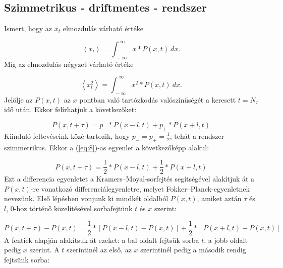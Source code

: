 \section{}
\subsection{Szimmetrikus - driftmentes - rendszer}
Ismert, hogy az $x_{t}$ elmozdulás várható értéke

\begin{equation} \label{eq:6}
    \left< x_{t} \right>
    =
    \int_{\ -\infty}^{\ \infty} x * P \left( x, t \right)\ dx.
\end{equation}
Míg az elmozdulás négyzet várható értéke

\begin{equation} \label{eq:7}
    \left< x_{t}^{2} \right>
    =
    \int_{\ -\infty}^{\ \infty} x^{2} * P \left( x, t \right)\ dx.
\end{equation}
Jelölje az $P \left( x, t \right)$ az $x$ pontban való tartózkodás valószínűségét a keresett $t = N_\tau$ idő után. Ekkor felírhatjuk a következőket\cite{randwalk}:

\begin{equation} \label{eq:8}
    P \left( x, t + \tau \right)
    =
    p_{-} * P \left( x - l, t \right) + p_{+} * P \left( x + l, t \right)
\end{equation}
Kiinduló feltevéseink közé tartozik, hogy $p_{-} = p_{+} = \frac{1}{2}$, tehát a rendszer szimmetrikus. Ekkor a (\ref{eq:8})-as egyenlet a következőképp alakul:

\begin{equation} \label{eq:9}
    P \left( x, t + \tau \right)
    =
    \frac{1}{2} * P \left( x - l, t \right) + \frac{1}{2} * P \left( x + l, t \right)
\end{equation}
Ezt a differencia egyenletet a Kramers--Moyal-sorfejtés segítségével alakítjuk át a $P \left( x, t \right)$-re vonatkozó differenciálegyenletre, melyet Fokker--Planck-egyenletnek nevezünk\cite{2007cond.mat..1242G}. Első lépésben vonjunk ki mindkét oldalból $P \left( x, t \right)$, amiket aztán $\tau$ és $l$, $0$-hoz történő közelítésével sorbafejtünk $t$ és $x$ szerint:

\begin{equation} \label{eq:10}
    P \left( x, t + \tau \right) - P \left( x, t \right)
    =
    \frac{1}{2} * \left[ P \left( x - l, t \right) - P \left( x, t \right) \right] + \frac{1}{2} * \left[ P \left( x + l, t \right) - P \left( x, t \right) \right]
\end{equation}
A fentiek alapján alakítsuk át ezeket: a bal oldalt fejtsük sorba $t$, a jobb oldalt pedig $x$ szerint. A $t$ szerintinél az első, az $x$ szerintinél pedig a második rendig fejtsünk sorba:


